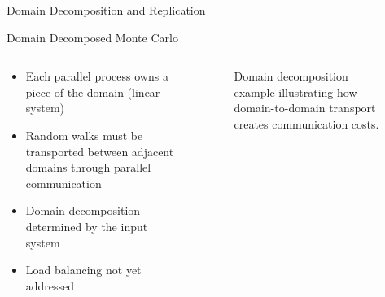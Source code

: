 \documentclass{beamer}
\begin{document}
\begin{frame}

  \center Domain Decomposition and Replication
  
\end{frame}

\begin{frame}{Domain Decomposed Monte Carlo}

  \begin{columns}
    \begin{column}{0.5\textwidth}
      \begin{itemize}
      \item Each parallel process owns a piece of the domain (linear
        system)
        \bigskip
      \item Random walks must be transported between adjacent domains
        through parallel communication
        \bigskip
      \item Domain decomposition determined by the input system
        \bigskip
      \item Load balancing not yet addressed
      \end{itemize}
    \end{column}

    \begin{column}{0.5\textwidth}
      \begin{figure}[htpb!]
        \begin{center}
          \scalebox{0.75}{  }
        \end{center}
        \caption{\small Domain decomposition example illustrating
          how domain-to-domain transport creates communication costs.}
      \end{figure}
    \end{column}
  \end{columns}

\end{frame}
\end{document}
